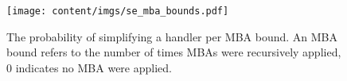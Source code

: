 \documentclass[letterpaper,twocolumn,10pt]{article}
\theoremstyle{customexample}
\theoremstyle{customexperiment}
\begin{document}
\begin{figure}[htb]
\centering
    \texttt{[image: content/imgs/se\_mba\_bounds.pdf]}
    \caption{The probability of simplifying a handler per MBA bound. An MBA bound refers to the number of times MBAs were recursively applied, 0 indicates no MBA were applied.}\label{fig:se_mba_bounds_appendix}\end{figure} 
\end{document}
